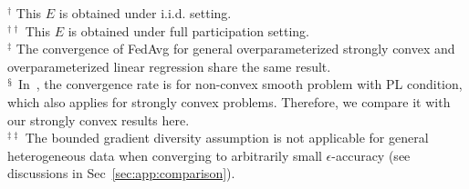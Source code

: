 \begin{table}[h!]
{\raggedright 
         $^{\dagger}$ This $E$ is obtained under i.i.d. setting. \\
         $^{\dagger\dagger}$ This $E$ is obtained under full participation setting. \\ 
         $^{\ddagger}$ The convergence of FedAvg for general overparameterized strongly convex and overparameterized linear regression share the same result.\\
         $^{\mathsection}$ In~\cite{haddadpour2019convergence}, the convergence rate is for non-convex smooth problem with PL condition, which also applies for strongly convex problems. Therefore, we compare it with our strongly convex results here. \\
         $^{\ddagger\ddagger}$ The bounded gradient diversity assumption is not applicable for general heterogeneous data when converging to arbitrarily small $\epsilon$-accuracy (see discussions in Sec~\ref{sec:app:comparison}).
           \par}
\label{tb:convergenceratev3}
\end{table}




